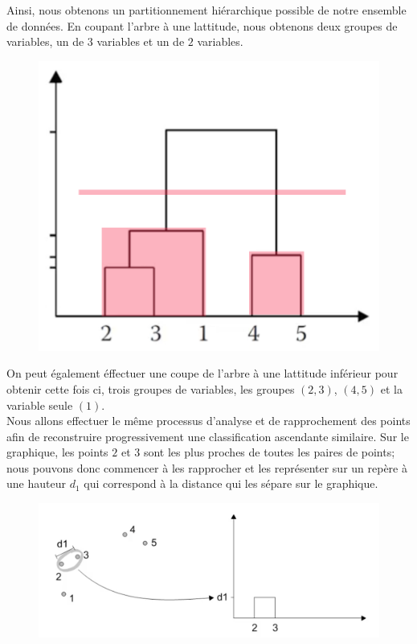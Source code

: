 Ainsi, nous obtenons un partitionnement hiérarchique possible de notre ensemble de données.\newline
En coupant l'arbre à une lattitude, nous obtenons deux groupes de variables, un de $3$ variables et un de $2$ variables.
\begin{figure}[H]\begin{center}\includegraphics[scale=0.5]{ilu/ClassHierarArbgroupehaut.png}\end{center}\end{figure}
On peut également éffectuer une coupe de l'arbre à une lattitude inférieur pour obtenir cette fois ci, trois groupes de variables, les groupes $(2,3)$, $(4,5)$ et la variable seule $(1)$.\newline
\\
Nous allons effectuer le même processus d'analyse et de rapprochement des points afin de reconstruire progressivement une classification ascendante similaire.\newline
Sur le graphique, les points $2$ et $3$ sont les plus proches de toutes les paires de points; nous pouvons donc commencer à les rapprocher et les représenter sur un repère à une hauteur $d_{1}$ qui correspond à la distance qui les sépare sur le graphique.

\begin{figure}[H]\begin{center}\includegraphics[scale=0.5]{ilu/ClassHierarConstruc1.png}\end{center}\end{figure}

